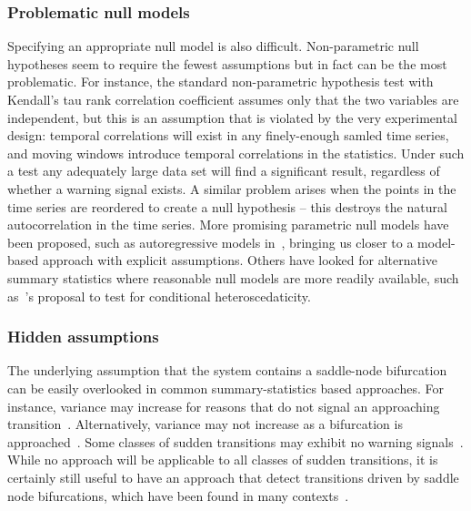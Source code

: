 \documentclass[authoryear,review,11pt]{elsarticle}
\begin{document}
\subsubsection*{Problematic null models}
Specifying an appropriate null model is also difficult.  
Non-parametric null hypotheses seem to require the fewest assumptions but in fact can be the most problematic.  
For instance, the standard non-parametric hypothesis test with Kendall's tau rank correlation coefficient
assumes only that the two variables are independent,
but this is an assumption that is violated by the very experimental design:
temporal correlations will exist in any finely-enough samled time series, 
and moving windows introduce temporal correlations in the statistics.
Under such a test any adequately large data set will find a significant result,
regardless of whether a warning signal exists.
A similar problem arises when the points in the time series are reordered to create a null hypothesis -- 
this destroys the natural autocorrelation in the time series.  
More promising parametric null models have been proposed, 
such as autoregressive models in~\citet{Dakos2008}, bringing us  
closer to a model-based approach with explicit assumptions.  
Others have looked for alternative summary statistics where 
reasonable null models are more readily available, 
such as~\citet{Seekell2011}'s proposal to test for conditional heteroscedaticity.

\subsubsection*{Hidden assumptions}
The underlying assumption that the system contains a saddle-node bifurcation
can be easily overlooked in common summary-statistics based approaches.  
For instance, variance may increase for reasons that 
do not signal an approaching transition~\citep{Schreiber2003, Schreiber2008}.
Alternatively, variance may not increase as a bifurcation is approached~\citep{Livina2012, Dakos2011a}.
Some classes of sudden transitions may exhibit no warning signals~\cite{Hastings2010}.   
While no approach will be applicable to all classes of sudden transitions,
it is certainly still useful to have an approach that detect transitions driven by 
saddle node bifurcations, which have been found in many contexts~\citep[\emph{e.g.}, see][]{Scheffer2001}.  
\end{document}

